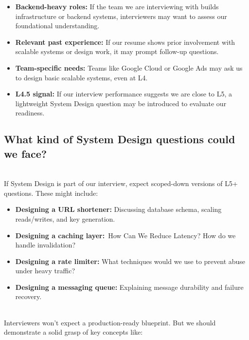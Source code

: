 \begin{itemize}
\item
\protect{}\label{6A1kzgRZjk-Rk_rCZ8F5J}
\textbf{Backend-heavy roles:} If the team we are interviewing with builds infrastructure or backend systems, interviewers may want to assess our foundational understanding.
\item
\protect{}\label{uSmE7CQpKO70ZSJPzGCyc}
\textbf{Relevant past experience:} If our resume shows prior involvement with scalable systems or design work, it may prompt follow-up questions.
\item
\protect{}\label{qf2YvF1NN76fSiE_s6Qbb}
\textbf{Team-specific needs:} Teams like Google Cloud or Google Ads may ask us to design basic scalable systems, even at L4.
\item
\protect{}\label{MzI0g95y0LStxaD_JK1B-}
\textbf{L4.5 signal:} If our interview performance suggests we are close to L5, a lightweight System Design question may be introduced to evaluate our readiness.
\end{itemize}

\subsection{What kind of System Design questions could we face?}\label{fH6c5ULgo4kkJM_hLR3Gp}
\\
If System Design is part of our interview, expect scoped-down versions of L5+ questions. These might include:

\begin{itemize}
\item
\protect{}\label{Tt9F-owygQZe-8rxFNUym}
\textbf{Designing a URL shortener:} Discussing database schema, scaling reads/writes, and key generation.
\item
\protect{}\label{8R4S5FQmWgvAm3Au4EvLc}
\textbf{Designing a caching layer:}~How Can We Reduce Latency? How do we handle invalidation?
\item
\protect{}\label{bRevqRoPZSki8Bxaug7ox}
\textbf{Designing a rate limiter:} What techniques would we use to prevent abuse under heavy traffic?
\item
\protect{}\label{oNaiUbc2aFrm6KbYma0XV}
\textbf{Designing a messaging queue:} Explaining message durability and failure recovery.
\end{itemize}
\\
Interviewers won't expect a production-ready blueprint. But we should demonstrate a solid grasp of key concepts like:

